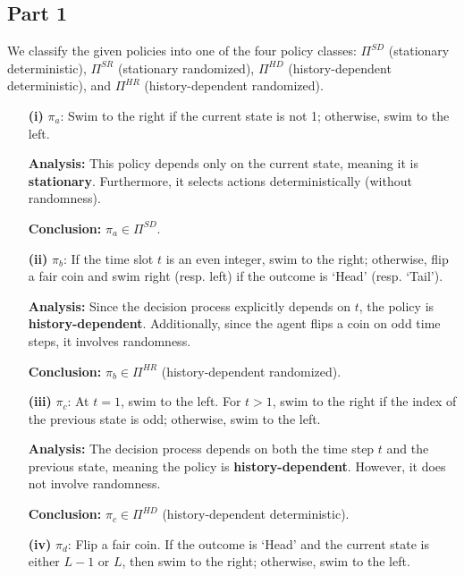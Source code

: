 \subsection*{Part 1}

We classify the given policies into one of the four policy classes: 
\(\Pi^{SD}\) (stationary deterministic), \(\Pi^{SR}\) (stationary randomized), 
\(\Pi^{HD}\) (history-dependent deterministic), and \(\Pi^{HR}\) (history-dependent randomized). 

\begin{enumerate}
    \item[\textbf{(i)}] \(\pi_a\): Swim to the right if the current state is not 1; otherwise, swim to the left.
    
    \textbf{Analysis:} This policy depends only on the current state, meaning it is \textbf{stationary}. Furthermore, it selects actions deterministically (without randomness). 
    
    \textbf{Conclusion:} \(\pi_a \in \Pi^{SD}\).

    \item[\textbf{(ii)}] \(\pi_b\): If the time slot \(t\) is an even integer, swim to the right; otherwise, flip a fair coin and swim right (resp. left) if the outcome is ‘Head’ (resp. ‘Tail’).

    \textbf{Analysis:} Since the decision process explicitly depends on \(t\), the policy is \textbf{history-dependent}. Additionally, since the agent flips a coin on odd time steps, it involves randomness. 

    \textbf{Conclusion:} \(\pi_b \in \Pi^{HR}\) (history-dependent randomized).
    
    \item[\textbf{(iii)}] \(\pi_c\): At \(t=1\), swim to the left. For \(t>1\), swim to the right if the index of the previous state is odd; otherwise, swim to the left.

    \textbf{Analysis:} The decision process depends on both the time step \(t\) and the previous state, meaning the policy is \textbf{history-dependent}. However, it does not involve randomness.

    \textbf{Conclusion:} \(\pi_c \in \Pi^{HD}\) (history-dependent deterministic).

    \item[\textbf{(iv)}] \(\pi_d\): Flip a fair coin. If the outcome is ‘Head’ and the current state is either \(L-1\) or \(L\), then swim to the right; otherwise, swim to the left.


\end{enumerate}
